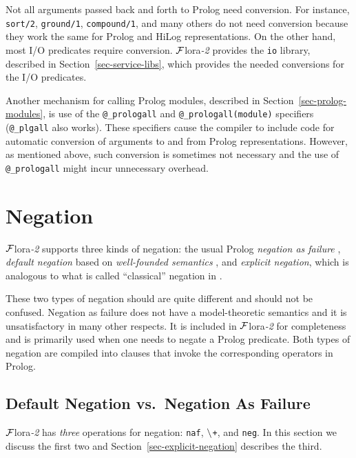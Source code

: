 \documentclass[11pt]{article}
\newcommand{\FLORA}{{\mbox{\sc ${\cal F}${lora}\rm\emph{-2}}}\xspace}
\newcommand{\PLGNAF}{\mbox{\tt \ensuremath{\tt\backslash}+}\xspace}
\newcommand{\RULELOGNAF}{{{\tt naf}}\xspace}
\begin{document}
Not all arguments passed back and forth to Prolog need conversion. For
instance, {\tt sort/2}, {\tt ground/1}, {\tt compound/1}, and many others
do not need conversion because they work the same for Prolog and HiLog
representations. On the other hand, most I/O predicates require conversion.
\FLORA provides the {\tt io} library, described in
Section~\ref{sec-service-libs}, which provides the needed conversions for
the I/O predicates.


Another mechanism for calling Prolog modules, described in
Section~\ref{sec-prolog-modules}, is use of the {\tt @\_prologall} and
{\tt @\_prologall(module)} specifiers ({\tt @\_plgall} also works). These
specifiers cause the compiler to include code for automatic conversion of
arguments to and from Prolog representations. However, as mentioned above,
such conversion is sometimes not necessary and the use of {\tt
  @\_prologall} might incur unnecessary overhead.



\section{Negation} \label{sec:negation}


\FLORA supports three kinds of negation: the usual Prolog \emph{negation as
  failure} \cite{Cla78}, \emph{default negation} based on
\emph{well-founded semantics}
\cite{gelder-alternating-89,gelder-ross-schlipf-91}, and \emph{explicit
  negation}, which is analogous to what is called ``classical'' negation in
\cite{gelfond91classical}.
 
These two types of negation should are quite different and should not be
confused. Negation as failure does not have a model-theoretic semantics
and it is unsatisfactory in many other respects. It is included in \FLORA
for completeness and is primarily used when one needs to negate a Prolog
predicate.
Both types of negation
are compiled into clauses that invoke the corresponding operators in
Prolog.

\subsection{Default Negation vs.~Negation As Failure}\label{sec-negation}
\index{\RULELOGNAF}
\index{\PLGNAF}
\FLORA has \emph{three} operations for negation: \RULELOGNAF, \PLGNAF, and {\tt neg}.
In this section we discuss the first two and
Section~\ref{sec-explicit-negation} describes the third.
\end{document}

